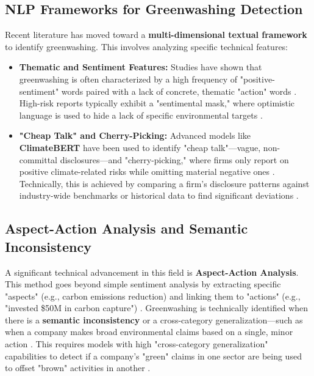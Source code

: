 \documentclass[english, online, cse, master]{dithesis}
\begin{document}
\subsection{ NLP Frameworks for Greenwashing Detection}

Recent literature has moved toward a \textbf{multi-dimensional textual framework} to identify greenwashing. This involves analyzing specific technical features:
\begin{itemize}
\item 

\textbf{Thematic and Sentiment Features:} Studies have shown that greenwashing is often characterized by a high frequency of "positive-sentiment" words paired with a lack of concrete, thematic "action" words  \parencite{xiaojia_wang_02351a60}. High-risk reports typically exhibit a "sentimental mask," where optimistic language is used to hide a lack of specific environmental targets  \parencite{xiaojia_wang_02351a60}.\item 

\textbf{"Cheap Talk" and Cherry-Picking:} Advanced models like \textbf{ClimateBERT} have been used to identify "cheap talk"—vague, non-committal disclosures—and "cherry-picking," where firms only report on positive climate-related risks while omitting material negative ones  \parencite{julia_bingler_268445e3}. Technically, this is achieved by comparing a firm's disclosure patterns against industry-wide benchmarks or historical data to find significant deviations  \parencite{julia_bingler_268445e3}.
\end{itemize}
\subsection{ Aspect-Action Analysis and Semantic Inconsistency}

A significant technical advancement in this field is \textbf{Aspect-Action Analysis}. This method goes beyond simple sentiment analysis by extracting specific "aspects" (e.g., carbon emissions reduction) and linking them to "actions" (e.g., "invested \$50M in carbon capture")  \parencite{keane_ong_369a0b63}. Greenwashing is technically identified when there is a \textbf{semantic inconsistency} or a cross-category generalization—such as when a company makes broad environmental claims based on a single, minor action  \parencite{keane_ong_369a0b63}. This requires models with high "cross-category generalization" capabilities to detect if a company's "green" claims in one sector are being used to offset "brown" activities in another  \parencite{keane_ong_369a0b63}.
\end{document}
